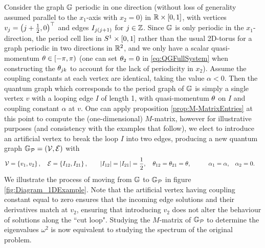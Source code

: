 Consider the graph $\mathbb{G}$ periodic in one direction (without loss of generality assumed parallel to the $x_1$-axis with $x_2=0$) in $\mathbb{R}\times\left[ 0,1 \right]$, with vertices $v_j = \left( j + \frac{1}{2}, 0 \right)^\top$ and edges $I_{j\left( j+1 \right)}$ for $j\in\mathbb{Z}$.
Since $\mathbb{G}$ is only periodic in the $x_1$-direction, the period cell lies in $S^1\times\left[ 0,1 \right]$ rather than the usual 2D-torus for a graph periodic in two directions in $\mathbb{R}^2$, and we only have a scalar quasi-momentum $\theta\in\left[-\pi,\pi\right)$ (one can set $\theta_2=0$ in \eqref{eq:QGFullSystem} when constructing the $\theta_{jk}$ to account for the lack of periodicity in $x_2$).
Assume the coupling constants at each vertex are identical, taking the value $\alpha<0$.
Then the quantum graph which corresponds to the period graph of $\mathbb{G}$ is simply a single vertex $v$ with a looping edge $I$ of length 1, with quasi-momentum $\theta$ on $I$ and coupling constant $\alpha$ at $v$. 
One can apply proposition \ref{prop:M-MatrixEntries} at this point to compute the (one-dimensional) $M$-matrix, however for illustrative purposes (and consistency with the examples that follow), we elect to introduce an artificial vertex to break the loop $I$ into two edges, producing a new quantum graph $\mathbb{G}_{\mathcal{P}}=\left( \mathcal{V}, \mathcal{E} \right)$ with
\begin{align*}
	\mathcal{V} = \left\{  v_1 , v_2  \right\}, \quad \mathcal{E} = \left\{  I_{12}, I_{21}  \right\},
	&\qquad \left\lvert I_{12} \right\rvert = \left\lvert I_{21} \right\rvert = \frac{1}{2}, \quad \theta_{12} = \theta_{21} = \theta, 
	&\qquad \alpha_1 = \alpha, \quad &\alpha_2 = 0.
\end{align*}
We illustrate the process of moving from $\mathbb{G}$ to $\mathbb{G}_{\mathcal{P}}$ in figure \ref{fig:Diagram_1DExample}.
Note that the artificial vertex having coupling constant equal to zero ensures that the incoming edge solutions and their derivatives match at $v_2$, ensuring that introducing $v_2$ does not alter the behaviour of solutions along the ``cut loop".
Studying the $M$-matrix of $\mathbb{G}_{\mathcal{P}}$ to determine the eigenvalues $\omega^2$ is now equivalent to studying the spectrum of the original problem.
